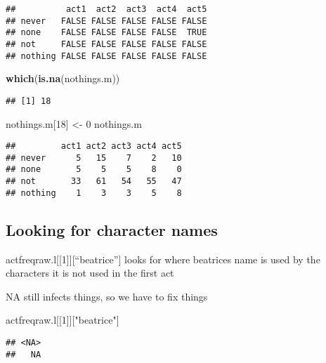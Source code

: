 \documentclass[
]{article}
\newenvironment{Shaded}{\begin{snugshade}}{\end{snugshade}}
\newcommand{\DecValTok}[1]{\textcolor[rgb]{0.00,0.00,0.81}{#1}}
\newcommand{\KeywordTok}[1]{\textcolor[rgb]{0.13,0.29,0.53}{\textbf{#1}}}
\newcommand{\NormalTok}[1]{#1}
\newcommand{\StringTok}[1]{\textcolor[rgb]{0.31,0.60,0.02}{#1}}
\begin{document}
\begin{verbatim}
##          act1  act2  act3  act4  act5
## never   FALSE FALSE FALSE FALSE FALSE
## none    FALSE FALSE FALSE FALSE  TRUE
## not     FALSE FALSE FALSE FALSE FALSE
## nothing FALSE FALSE FALSE FALSE FALSE
\end{verbatim}

\begin{Shaded}
\begin{Highlighting}[]
\KeywordTok{which}\NormalTok{(}\KeywordTok{is.na}\NormalTok{(nothings.m))}
\end{Highlighting}
\end{Shaded}

\begin{verbatim}
## [1] 18
\end{verbatim}

\begin{Shaded}
\begin{Highlighting}[]
\NormalTok{nothings.m[}\DecValTok{18}\NormalTok{] <-}\StringTok{ }\DecValTok{0}
\NormalTok{nothings.m}
\end{Highlighting}
\end{Shaded}

\begin{verbatim}
##         act1 act2 act3 act4 act5
## never      5   15    7    2   10
## none       5    5    5    8    0
## not       33   61   54   55   47
## nothing    1    3    3    5    8
\end{verbatim}

\hypertarget{looking-for-character-names}{%
\subsection{Looking for character
names}\label{looking-for-character-names}}

actfreqraw.l{[}{[}1{]}{]}{[}``beatrice''{]} looks for where beatrices
name is used by the characters it is not used in the first act

NA still infects things, so we have to fix things

\begin{Shaded}
\begin{Highlighting}[]
\NormalTok{actfreqraw.l[[}\DecValTok{1}\NormalTok{]][}\StringTok{"beatrice"}\NormalTok{]}
\end{Highlighting}
\end{Shaded}

\begin{verbatim}
## <NA> 
##   NA
\end{verbatim}
\end{document}

